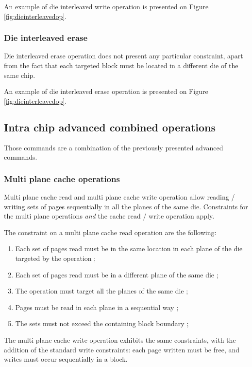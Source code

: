 An example of die interleaved write operation is presented on Figure \ref{fig:dieinterleavedop}.

\subsubsection{Die interleaved erase}
Die interleaved erase operation does not present any particular constraint, apart from the fact that each targeted block must be located in a different die of the same chip.

An example of die interleaved erase operation is presented on Figure \ref{fig:dieinterleavedop}.

\subsection{Intra chip advanced combined operations}
Those commands are a combination of the previously presented advanced commands.

\subsubsection{Multi plane cache operations}
Multi plane cache read and multi plane cache write operation allow reading / writing sets of pages sequentially in all the planes of the same die. Constraints for the multi plane operations \emph{and} the cache read / write operation apply.

The constraint on a multi plane cache read operation are the following:

\begin{enumerate}
  \item Each set of pages read must be in the same location in each plane of the die targeted by the operation ;
  \item Each set of pages read must be in a different plane of the same die ;
  \item The operation must target all the planes of the same die ;
  \item Pages must be read in each plane in a sequential way ;
  \item The sets must not exceed the containing block boundary ;
\end{enumerate}

The multi plane cache write operation exhibits the same constraints, with the addition of the standard write constraints: each page written must be free, and writes must occur sequentially in a block.

